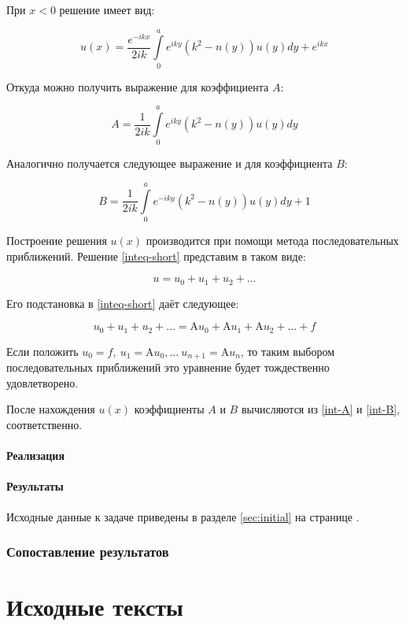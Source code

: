 \documentclass{article}
\providecommand{\op}[1]{\mathrm{#1}}
\numberwithin{equation}{section}
\begin{document}
При $x < 0$ решение имеет вид:

\[
u(x) = \frac{e^{-ikx}}{2ik} \int \limits_{0}^{a} {e^{iky} (k^2-n(y)) u(y) dy} + e^{ikx}
\]

Откуда можно получить выражение для коэффициента $A$:

\begin{equation}\label{int-A}
  A = \frac{1}{2ik} \int \limits_{0}^{a} {e^{iky} (k^2-n(y)) u(y) dy}
\end{equation}

Аналогично получается следующее выражение и для коэффициента $B$:

\begin{equation}\label{int-B}
  B = \frac{1}{2ik} \int \limits_{0}^{a} {e^{-iky} (k^2-n(y)) u(y) dy} + 1
\end{equation}

Построение решения $u(x)$ производится при помощи метода
последовательных приближений. Решение \eqref{inteq-short} представим в
таком виде:

\[
u = u_0 + u_1 + u_2 + \ldots
\]

Его подстановка в \eqref{inteq-short} даёт следующее:

\[
 u_0 + u_1 + u_2 + \ldots = \op{A}u_0 + \op{A}u_1 +
 \op{A}u_2 + \ldots + f
\]

Если положить $u_0 = f,\ u_1 = \op{A}u_0, \ldots\ u_{n+1} =
\op{A} u_n$, то таким выбором последовательных приближений это
уравнение будет тождественно удовлетворено.

После нахождения $u(x)$ коэффициенты $A$ и $B$ вычисляются из
\eqref{int-A} и \eqref{int-B}, соответственно.

\newpage
\subsection{Реализация}

\newpage
\subsection{Результаты}

Исходные данные к задаче приведены в разделе \ref{sec:initial} на
странице \pageref{sec:initial}.

\newpage
\section{Сопоставление результатов}

\newpage
\appendix
\part{Исходные тексты}
\end{document}

